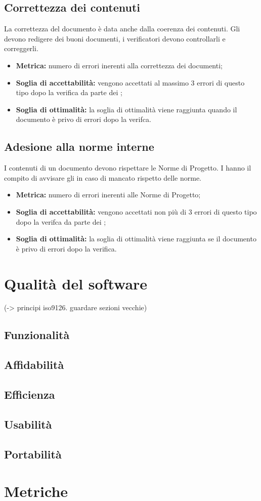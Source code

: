 \subsection{Correttezza dei contenuti}
La correttezza del documento è data anche dalla coerenza dei contenuti. Gli  devono redigere dei buoni documenti, i verificatori devono controllarli e correggerli.
\begin{itemize}
    \item \textbf{Metrica:} numero di errori inerenti alla correttezza dei documenti;
    \item \textbf{Soglia di accettabilità:} vengono accettati al massimo 3 errori di questo tipo dopo la verifica da parte dei ;
    \item \textbf{Soglia di ottimalità:} la soglia di ottimalità viene raggiunta quando il documento è privo di errori dopo la verifca.
\end{itemize}
\subsection{Adesione alla norme interne}
I contenuti di un documento devono rispettare le Norme di Progetto. I  hanno il compito di avvisare gli  in caso di mancato rispetto delle norme.
\begin{itemize}
    \item \textbf{Metrica:} numero di errori inerenti alle Norme di Progetto;
    \item \textbf{Soglia di accettabilità:} vengono accettati non più di 3 errori di questo tipo dopo la verifca da parte dei ;
    \item \textbf{Soglia di ottimalità:} la soglia di ottimalità viene raggiunta se il documento è privo di errori dopo la verifica.
\end{itemize}

\section{Qualità del software}
\label{software}
(-> principi iso9126. guardare sezioni vecchie) 

\subsection{Funzionalità}

\subsection{Affidabilità}

\subsection{Efficienza}

\subsection{Usabilità}

\subsection{Portabilità}

\section{Metriche}